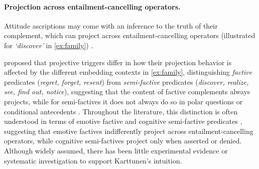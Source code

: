 

\vspace{-\baselineskip}
\paragraph{Projection across entailment-cancelling operators.}  \hspace{-1em}
	Attitude ascriptions may come with an inference to the truth of their complement, which can project across entailment-cancelling operators (illustrated for \emph{\lq discover\rq} in \ref{ex:family}) \citep[et seq.]{kiparsky_fact_1970}.


	\vspace{-.4\baselineskip}
	\citet{karttunen_observations_1971} proposed that projective triggers differ in how their projection behavior is affected by the different embedding contexts in \ref{ex:family}, distinguishing \emph{factive} predicates (\emph{regret, forget, resent}) from \emph{semi-factive} predicates (\emph{discover, realize, see, find out, notice}), suggesting that the content of factive complements always projects, while for semi-factives it does not always do so in polar questions or conditional antecedents \citep[see also][]{stalnaker_pragmatic_1977}. Throughout the literature, this distinction is often understood in terms of emotive factive and cognitive semi-factive predicates \citep{klein_two_1975,djarv_cognitive_2018}, suggesting that emotive factives indifferently project across entailment-cancelling operators, while cognitive semi-factives project only when asserted or denied.
	Although widely assumed, there has been little experimental evidence or systematic investigation to support Karttunen's intuition.



